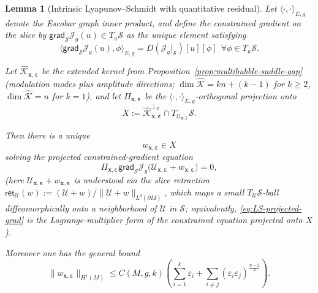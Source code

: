 \documentclass[11pt,reqno,a4paper]{amsart}
\numberwithin{equation}{section}
\theoremstyle{plain}
\newtheorem{lemma}[theorem]{Lemma}
\theoremstyle{remark}
\theoremstyle{plain}
\begin{document}
\begin{lemma}[Intrinsic Lyapunov--Schmidt with quantitative residual]
Let $\langle\cdot,\cdot\rangle_{E,g}$ denote the Escobar graph inner product, and define the constrained gradient on the slice by $\mathsf{grad}_{\mathcal S}\mathcal J_g(u)\in T_u\mathcal S$ as the unique element satisfying $$\langle \mathsf{grad}_{\mathcal S}\mathcal J_g(u),\phi\rangle_{E,g}
= D(\mathcal J_g|_{\mathcal S})[u][\phi]\ \ \forall\phi\in T_u\mathcal S.$$

Let $\widehat{\mathcal K}_{\mathbf x,\boldsymbol\varepsilon}$ be the extended kernel from
Proposition~\ref{prop:multibubble-saddle-gap} (modulation modes plus amplitude directions;
$\dim\widehat{\mathcal K}=kn+(k-1)$ for $k\ge2$, $\dim\widehat{\mathcal K}=n$ for $k=1$),
and let $\Pi_{\mathbf x,\boldsymbol\varepsilon}$ be the
$\langle\cdot,\cdot\rangle_{E,g}$-orthogonal projection onto
\[
X:=\widehat{\mathcal K}_{\mathbf x,\boldsymbol\varepsilon}^{\perp_E}\cap T_{\mathcal U_{\mathbf x,\boldsymbol\varepsilon}}\mathcal S.
\]

Then there is a unique
\[
w_{\mathbf x,\boldsymbol\varepsilon}\in X
\]
solving the projected constrained-gradient equation
\begin{equation}\label{eq:LS-projected-grad}
\Pi_{\mathbf x,\boldsymbol\varepsilon}
\mathsf{grad}_{\mathcal S}\mathcal J_g\big(\mathcal U_{\mathbf x,\boldsymbol\varepsilon}+w_{\mathbf x,\boldsymbol\varepsilon}\big)=0,
\end{equation}
(here $\mathcal U_{\mathbf x,\boldsymbol\varepsilon}+w_{\mathbf x,\boldsymbol\varepsilon}$ is understood via the
slice retraction $\mathsf{ret}_{\mathcal U}(w):=(\mathcal U+w)/\|\mathcal U+w\|_{L^q(\partial M)}$,
which maps a small $T_{\mathcal U}\mathcal S$-ball diffeomorphically onto a neighborhood of $\mathcal U$ in $\mathcal S$;
equivalently, \eqref{eq:LS-projected-grad} is the Lagrange-multiplier form of the constrained equation projected onto $X$).

Moreover one has the \emph{general} bound
\begin{equation}\label{eq:LS-w-bound-general}
\|w_{\mathbf x,\boldsymbol\varepsilon}\|_{H^1(M)}
\le
C(M,g,k)\left(
\sum_{i=1}^k \varepsilon_i
+
\sum_{i\ne j}(\varepsilon_i\varepsilon_j)^{\frac{n-2}{2}}
\right).
\end{equation}


\end{lemma}
\end{document}

